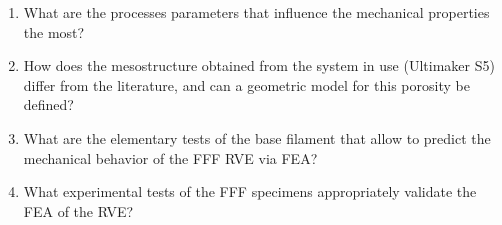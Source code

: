 
\begin{enumerate}
	\item What are the processes parameters that influence the mechanical properties the most?
	\item How does the mesostructure obtained from the system in use (Ultimaker S5) differ from the literature, and can a geometric model for this porosity be defined?
	\item What are the elementary tests of the base filament that allow to predict the mechanical behavior of the FFF RVE via FEA?
	\item What experimental tests of the FFF specimens appropriately validate the FEA of the RVE? 
\end{enumerate}











